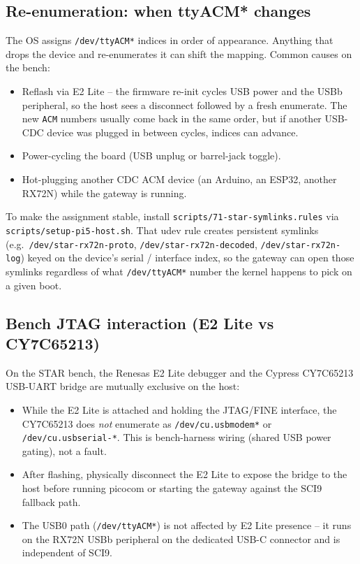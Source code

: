 \subsection{Re-enumeration: when ttyACM* changes}

The OS assigns \texttt{/dev/ttyACM*} indices in order of appearance.
Anything that drops the device and re-enumerates it can shift the
mapping. Common causes on the bench:

\begin{itemize}
  \item Reflash via E2 Lite -- the firmware re-init cycles USB power
        and the USBb peripheral, so the host sees a disconnect followed
        by a fresh enumerate. The new \texttt{ACM} numbers usually
        come back in the same order, but if another USB-CDC device
        was plugged in between cycles, indices can advance.
  \item Power-cycling the board (USB unplug or barrel-jack toggle).
  \item Hot-plugging another CDC ACM device (an Arduino, an ESP32,
        another RX72N) while the gateway is running.
\end{itemize}

To make the assignment stable, install
\texttt{scripts/71-star-symlinks.rules} via
\texttt{scripts/setup-pi5-host.sh}. That udev rule creates persistent
symlinks (e.g.\ \texttt{/dev/star-rx72n-proto},
\texttt{/dev/star-rx72n-decoded}, \texttt{/dev/star-rx72n-log}) keyed
on the device's serial / interface index, so the gateway can open
those symlinks regardless of what \texttt{/dev/ttyACM*} number the
kernel happens to pick on a given boot.

\subsection{Bench JTAG interaction (E2 Lite vs CY7C65213)}

On the STAR bench, the Renesas E2 Lite debugger and the Cypress
CY7C65213 USB-UART bridge are mutually exclusive on the host:

\begin{itemize}
  \item While the E2 Lite is attached and holding the JTAG/FINE
        interface, the CY7C65213 does \emph{not} enumerate as
        \texttt{/dev/cu.usbmodem*} or
        \texttt{/dev/cu.usbserial-*}. This is bench-harness wiring
        (shared USB power gating), not a fault.
  \item After flashing, physically disconnect the E2 Lite to expose
        the bridge to the host before running picocom or starting
        the gateway against the SCI9 fallback path.
  \item The USB0 path (\texttt{/dev/ttyACM*}) is not affected by E2
        Lite presence -- it runs on the RX72N USBb peripheral on
        the dedicated USB-C connector and is independent of SCI9.
\end{itemize}

